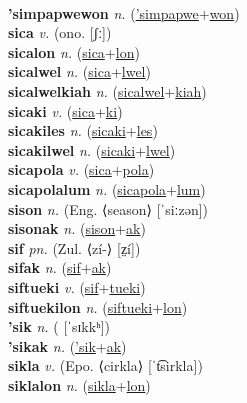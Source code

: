  \label{'simpapweak} \\
\textbf{'simpapwewon} \textit{n.} (\hyperref['simpapwe]{'simpapwe}+\hyperref[won]{won})
 \label{'simpapwewon} \\
\textbf{sica} \textit{v.} (ono. [ʃː])
 \label{sica} \\
\textbf{sicalon} \textit{n.} (\hyperref[sica]{sica}+\hyperref[lon]{lon})
 \label{sicalon} \\
\textbf{sicalwel} \textit{n.} (\hyperref[sica]{sica}+\hyperref[lwel]{lwel})
 \label{sicalwel} \\
\textbf{sicalwelkiah} \textit{n.} (\hyperref[sicalwel]{sicalwel}+\hyperref[kiah]{kiah})
 \label{sicalwelkiah} \\
\textbf{sicaki} \textit{v.} (\hyperref[sica]{sica}+\hyperref[ki]{ki})
 \label{sicaki} \\
\textbf{sicakiles} \textit{n.} (\hyperref[sicaki]{sicaki}+\hyperref[les]{les})
 \label{sicakiles} \\
\textbf{sicakilwel} \textit{n.} (\hyperref[sicaki]{sicaki}+\hyperref[lwel]{lwel})
 \label{sicakilwel} \\
\textbf{sicapola} \textit{v.} (\hyperref[sica]{sica}+\hyperref[pola]{pola})
 \label{sicapola} \\
\textbf{sicapolalum} \textit{n.} (\hyperref[sicapola]{sicapola}+\hyperref[lum]{lum})
 \label{sicapolalum} \\
\textbf{sison} \textit{n.} (Eng. ⟨season⟩ [ˈsiːzən])
 \label{sison} \\
\textbf{sisonak} \textit{n.} (\hyperref[sison]{sison}+\hyperref[ak]{ak})
 \label{sisonak} \\
\textbf{sif} \textit{pn.} (Zul. ⟨zí-⟩ [z̤í])
 \label{sif} \\
\textbf{sifak} \textit{n.} (\hyperref[sif]{sif}+\hyperref[ak]{ak})
 \label{sifak} \\
\textbf{siftueki} \textit{v.} (\hyperref[sif]{sif}+\hyperref[tueki]{tueki})
 \label{siftueki} \\
\textbf{siftuekilon} \textit{n.} (\hyperref[siftueki]{siftueki}+\hyperref[lon]{lon})
 \label{siftuekilon} \\
\textbf{'sik} \textit{n.} ( [ˈsɪkkʰ])
 \label{'sik} \\
\textbf{'sikak} \textit{n.} (\hyperref['sik]{'sik}+\hyperref[ak]{ak})
 \label{'sikak} \\
\textbf{sikla} \textit{v.} (Epo. ⟨cirkla⟩ [ˈt͡sirkla])
 \label{sikla} \\
\textbf{siklalon} \textit{n.} (\hyperref[sikla]{sikla}+\hyperref[lon]{lon})
